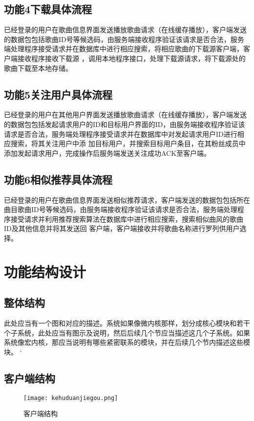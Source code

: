 \subsection{功能4下载具体流程}

已经登录的用户在歌曲信息界面发送播放歌曲请求（在线缓存播放），客户端发送的数据包包括歌曲ID号等候选码，由服务端接收程序验证该请求是否合法，服务端处理程序接受请求并在数据库中进行相应搜索，将相应歌曲的下载源客户端，客户端接收程序接收下载源 ，调用本地程序接口，处理下载源请求，将下载源处的歌曲下载至本地存储。

\subsection{功能5关注用户具体流程}

已经登录的用户在其他用户界面发送播放歌曲请求（在线缓存播放），客户端发送的数据包包括发起请求用户的ID和目标用户界面的ID，由服务端接收程序验证该请求是否合法，服务端处理程序接受请求并在数据库中对发起请求用户ID进行相应搜索，将其关注用户中添 加目标用户，并搜索目标用户条目，在其粉丝成员中添加发起请求用户，完成操作后服务端发送关注成功ACK至客户端。

\subsection{功能6相似推荐具体流程}

已经登录的用户在歌曲信息界面发送相似推荐请求，客户端发送的数据包包括所在曲目歌曲ID号等候选码，由服务端接收程序验证该请求是否合法，服务端处理程序接受请求并利用推荐搜索算法在数据库中进行相应搜索，搜索相似曲风的歌曲ID及其他信息并将其发送回 客户端，客户端接收并将歌曲名称进行罗列供用户选择。

\section{功能结构设计}
\subsection{整体结构}
此处应当有一个图和对应的描述。系统如果像微内核那样，划分成核心模块和若干个子系统，此处应当有图示及说明，然后后续几个节应当描述这几个子系统。如果系统像宏内核，那应当说明有哪些紧密联系的模块，并在后续几个节内描述这些模块。
`
\subsection{客户端结构}

\begin{figure}[H]
	\centering
	\texttt{[image: kehuduanjiegou.png]}
	\caption{客户端结构} 
	\label{fig:figure8asd}
\end{figure}


